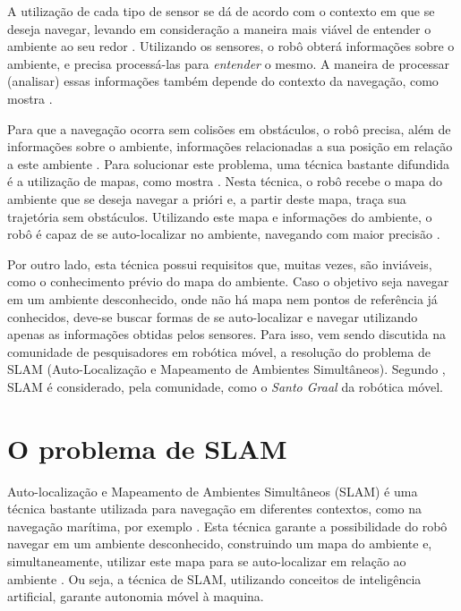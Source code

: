 A utilização de cada tipo de sensor se dá de acordo com o contexto em que se deseja navegar, levando em consideração a maneira mais viável de entender o ambiente ao seu redor \cite{agenteExploratorioKalman}. Utilizando os sensores, o robô obterá informações sobre o ambiente, e precisa processá-las para \textit{entender} o mesmo. A maneira de processar (analisar) essas informações também depende do contexto da navegação, como mostra \cite{roboBulldozerIV}.

Para que a navegação ocorra sem colisões em obstáculos, o robô precisa, além de informações sobre o ambiente, informações relacionadas a sua posição em relação a este ambiente \cite{theCleaningProject}. Para solucionar este problema, uma técnica bastante difundida é a utilização de mapas, como mostra \cite{roboBulldozerIV}. Nesta técnica, o robô recebe o mapa do ambiente que se deseja navegar a prióri e, a partir deste mapa, traça sua trajetória sem obstáculos. Utilizando este mapa e informações do ambiente, o robô é capaz de se auto-localizar no ambiente, navegando com maior precisão \cite{roboBulldozerIV}.

Por outro lado, esta técnica possui requisitos que, muitas vezes, são inviáveis, como o conhecimento prévio do mapa do ambiente. Caso o objetivo seja navegar em um ambiente desconhecido, onde não há mapa nem pontos de referência já conhecidos, deve-se buscar formas de se auto-localizar e navegar utilizando apenas as informações obtidas pelos sensores. Para isso, vem sendo discutida na comunidade de pesquisadores em robótica móvel, a resolução do problema de SLAM (Auto-Localização e Mapeamento de Ambientes Simultâneos). Segundo \cite{slamProblem}, SLAM é considerado, pela comunidade, como o \textit{Santo Graal} da robótica móvel.

\section{O problema de SLAM} %
\label{sec:section_name}

Auto-localização e Mapeamento de Ambientes Simultâneos (SLAM) é uma técnica bastante utilizada para navegação em diferentes contextos, como na navegação marítima, por exemplo \cite{slamProblem}. Esta técnica garante a possibilidade do robô navegar em um ambiente desconhecido, construindo um mapa do ambiente e, simultaneamente, utilizar este mapa para se auto-localizar em relação ao ambiente \cite{slamProblem}. Ou seja, a técnica de SLAM, utilizando conceitos de inteligência artificial, garante autonomia móvel à maquina.

